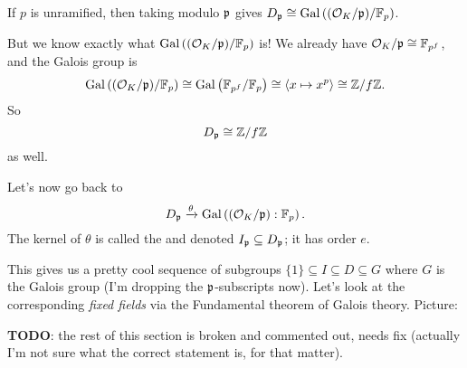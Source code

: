 \begin{moral}
	If $p$ is unramified, then taking
	modulo $\mathfrak p$ gives
	$D_\mathfrak p \cong \operatorname{Gal}\left( (\mathcal O_K/\mathfrak p) / \mathbb F_p \right)$.
\end{moral}

But we know exactly what $\operatorname{Gal}\left( (\mathcal O_K/\mathfrak p)/\mathbb F_p \right)$ is!
We already have $ \mathcal O_K / \mathfrak p \cong \mathbb F_{p^f} $, and the Galois group is
\[
	\operatorname{Gal}\left( (\mathcal O_K/\mathfrak p) / \mathbb F_p \right)
	\cong \operatorname{Gal}\left( \mathbb F_{p^f} / \mathbb F_p \right)
	\cong \left< x \mapsto x^p \right>
	\cong \mathbb Z/f\mathbb Z.
\]
So \[ D_\mathfrak p \cong \mathbb Z/f\mathbb Z \] as well.

Let's now go back to
\[ D_\mathfrak p \xrightarrow{\theta} \operatorname{Gal}\left( (\mathcal O_K/\mathfrak p) : \mathbb F_p \right). \]
The kernel of $\theta$ is called the 
and denoted $I_\mathfrak p \subseteq D_\mathfrak p$; it has order $e$.

This gives us a pretty cool sequence of subgroups
$\{1\} \subseteq I \subseteq D \subseteq G$
where $G$ is the Galois group (I'm dropping the $\mathfrak p$-subscripts now).
Let's look at the corresponding \emph{fixed fields} via the Fundamental theorem of Galois theory.
Picture:
\begin{center}
\end{center}

\textbf{TODO}:
the rest of this section is broken and commented out, needs fix
(actually I'm not sure what the correct statement is, for that matter).


